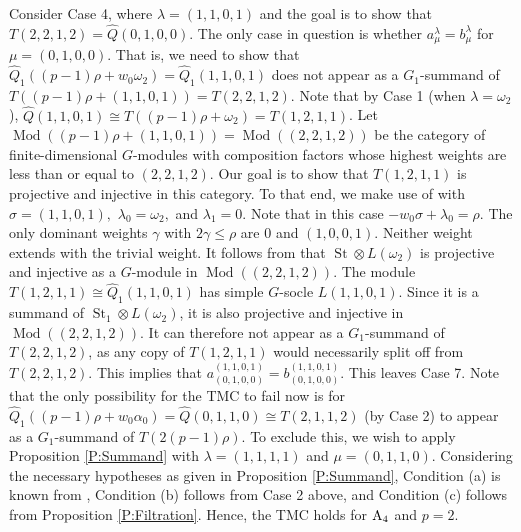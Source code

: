 \documentclass[twoside,11pt,reqno]{amsart}
\newcommand{\0}{\bar 0}
\newcommand{\1}{\bar 1}
\newcommand{\la}{\lambda}
\newcommand{\Mod}{\operatorname{Mod}}
\newcommand{\St}{\operatorname{St}}
\newcommand{\hQ}{\widehat{Q}}
\theoremstyle{definition}
\numberwithin{equation}{subsection}
\begin{document}
Consider Case 4, where $\la = (1,1,0,1)$ and the goal is to show that $T(2,2,1,2) = \hQ(0,1,0,0)$.   The only case in question is whether $a^{\la}_{\mu} = b^{\la}_{\mu}$ for $\mu = (0,1,0,0)$.  That is, we need to show that $\hQ_1((p-1)\rho +w_0\omega_2)=\hQ_1(1,1,0,1)$ does not appear as a $G_1$-summand of $T((p-1)\rho+ (1,1,0,1)) = T(2,2,1,2).$  Note that by Case 1 (when $\la = \omega_2$), $\hQ(1,1,0,1) \cong T((p-1)\rho + \omega_2) = T(1,2,1,1)$.  Let $\Mod((p-1)\rho + (1,1,0,1)) = \Mod((2,2,1,2))$ be the category of finite-dimensional $G$-modules with composition factors whose highest weights are less than or equal to $ (2,2,1,2)$.  Our goal is to show that $T(1,2,1,1)$ is projective and injective in this category. To that end, we make use of  \cite[Proposition 3.1.1]{BNPS22a} with $\sigma = (1,1,0,1),$ $\la_0=\omega_2,$  and $\la_1=0.$ Note that in this case $- w_0\sigma+ \la_0= \rho.$ The only dominant weights $\gamma$ with $2 \gamma \leq \rho$ are $0$ and $(1,0,0,1).$ Neither weight extends with the trivial weight. It follows from \cite[Proposition 3.1.1(a)]{BNPS22a} that $\St \otimes L(\omega_2)$ is projective  and injective as a $G$-module in $\Mod((2,2,1,2))$. The module $T(1,2,1,1)\cong \hQ_1(1,1,0,1)$ has simple $G$-socle $L(1,1,0,1).$ Since it is a summand of $\St_1 \otimes L(\omega_2)$, it is also projective and injective in $\Mod((2,2,1,2)).$ It can therefore not appear as a $G_1$-summand of $T(2,2,1,2)$, as any copy of $T(1,2,1,1)$ would necessarily split off from $T(2,2,1,2)$.  This implies that $a_{(0,1,0,0)}^{(1,1,0,1)} = b_{(0,1,0,0)}^{(1,1,0,1)}.$
﻿
This leaves Case 7. Note that the only possibility for the TMC to fail now is for $\hQ_1((p-1)\rho +w_0\alpha_0)=\hQ(0,1,1,0)\cong T(2,1,1,2)$ (by Case 2) to appear as a $G_1$-summand of $T(2(p-1)\rho).$ To exclude this, we wish to apply Proposition \ref{P:Summand} with $\lambda = (1,1,1,1)$ and $\mu = (0,1,1,0)$.   Considering the necessary hypotheses as given in Proposition \ref{P:Summand}, Condition (a) is known from \cite[Theorem 5.4.1]{BNPS19}, Condition (b) follows from Case 2 above, and Condition (c) follows from Proposition \ref{P:Filtration}.  Hence, the TMC holds for $\rm{A}_4$ and $p=2$.  
﻿
﻿
﻿
﻿
﻿
\providecommand{\bysame}{\leavevmode\hbox
to3em{\hrulefill}\thinspace}
\end{document}
